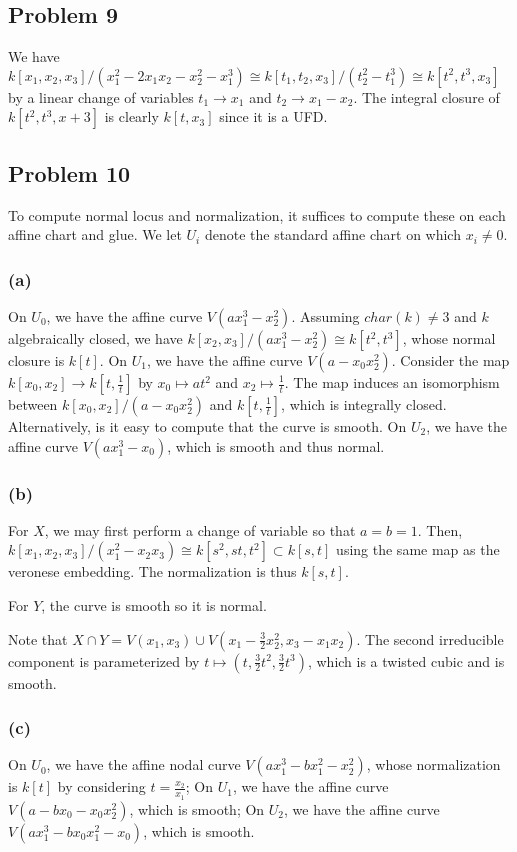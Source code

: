 \documentclass{article}
\theoremstyle{definition}
\theoremstyle{definition}
\theoremstyle{definition}
\theoremstyle{definition}
\theoremstyle{definition}
\theoremstyle{definition}
\theoremstyle{definition}
\begin{document}
\subsection*{Problem 9}
We have $k[x_1,x_2,x_3]/(x_1^2-2x_1x_2-x_2^2-x_1^3)\cong k[t_1,t_2,x_3]/(t_2^2-t_1^3)\cong k[t^2,t^3,x_3]$ by a linear change of variables $t_1\to x_1$ and $t_2\to x_1-x_2$. The integral closure of $k[t^2,t^3,x+3]$ is clearly $k[t,x_3]$ since it is a UFD.
\subsection*{Problem 10}
To compute normal locus and normalization, it suffices to compute these on each affine chart and glue. We let $U_i$ denote the standard affine chart on which $x_i\neq 0$. 

\subsubsection*{(a)}
On $U_0$, we have the affine curve $V(ax_1^3-x_2^2)$. Assuming $char (k)\neq 3$ and $k$ algebraically closed, we have $k[x_2,x_3]/(ax_1^3-x_2^2)\cong k[t^2,t^3]$, whose normal closure is $k[t]$. On $U_1$, we have the affine curve $V(a-x_0x_2^2)$. Consider the map $k[x_0,x_2]\to k[t,\frac{1}{t}]$ by $x_0\mapsto at^2$ and $x_2\mapsto \frac{1}{t}$. The map induces an isomorphism between $k[x_0,x_2]/(a-x_0x_2^2)$ and $k[t,\frac{1}{t}]$, which is integrally closed. Alternatively, is it easy to compute that the curve is smooth. On $U_2$, we have the affine curve $V(ax_1^3-x_0)$, which is smooth and thus normal.

\subsubsection*{(b)}
For $X$, we may first perform a change of variable so that $a=b=1$. Then, $k[x_1,x_2,x_3]/(x_1^2-x_2x_3)\cong k[s^2,st,t^2]\subset k[s,t]$ using the same map as the veronese embedding. The normalization is thus $k[s,t]$. 

For $Y$, the curve is smooth so it is normal. 

Note that $X\cap Y=V(x_1,x_3)\cup V(x_1-\frac{3}{2}x_2^2,x_3-x_1x_2)$. The second irreducible component is parameterized by $t\mapsto (t,\frac{3}{2}t^2,\frac{3}{2}t^3)$, which is a twisted cubic and is smooth.

\subsubsection*{(c)}
On $U_0$, we have the affine nodal curve $V(ax_1^3-bx_1^2-x_2^2)$, whose normalization is $k[t]$ by considering $t=\frac{x_2}{x_1}$; On $U_1$, we have the affine curve $V(a-bx_0-x_0x_2^2)$, which is smooth; On $U_2$, we have the affine curve $V(ax_1^3-bx_0x_1^2-x_0)$, which is smooth.
\end{document}
